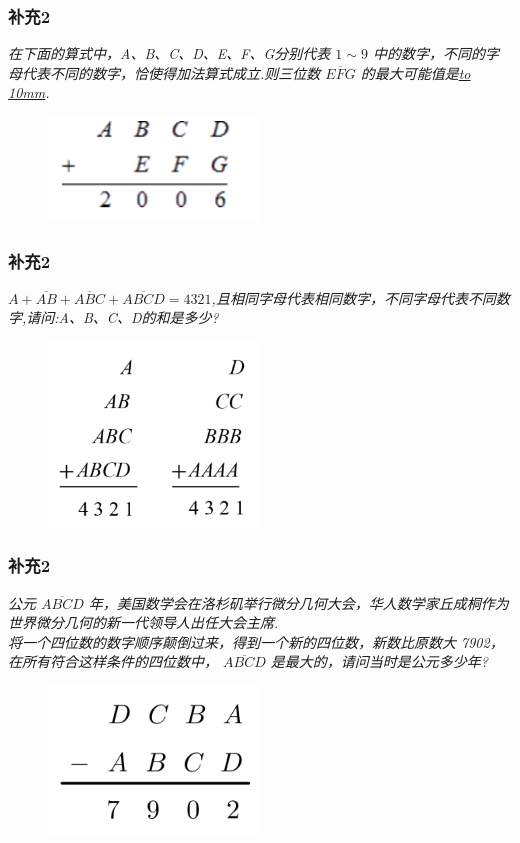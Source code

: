 \begin{frame}
    \frametitle{补充2}
    \textit{在下面的算式中，A、B、C、D、E、F、G分别代表 $1\sim 9$ 中的数字，不同的字母代表不同的数字，恰使得加法算式成立.则三位数 $\overline{EFG}$ 的最大可能值是\underline{\hbox to 10mm{}}.}
    \begin{figure}[H] 
        \centering
        \includegraphics[width=0.5\textwidth]{./pics/Chapter_3/buchong2_1.png}
    \end{figure}
\end{frame}

\begin{frame}
    \frametitle{补充2}
    \textit{$A+ \overline{AB} + \overline{ABC} + \overline{ABCD} = 4321$,且相同字母代表相同数字，不同字母代表不同数字,请问:A、B、C、D的和是多少?}
    \begin{figure}[H] 
        \centering
        \includegraphics[width=0.5\textwidth]{./pics/Chapter_3/buchong2_2.png}
    \end{figure}
\end{frame}

\begin{frame}
    \frametitle{补充2}
    \textit{公元 $\overline{ABCD}$ 年，美国数学会在洛杉矶举行微分几何大会，华人数学家丘成桐作为世界微分几何的新一代领导人出任大会主席.\\
    将一个四位数的数字顺序颠倒过来，得到一个新的四位数，新数比原数大 7902，在所有符合这样条件的四位数中， $\overline{ABCD}$ 是最大的，请问当时是公元多少年?}
    \begin{figure}[H] 
        \centering
        \includegraphics[width=0.5\textwidth]{./pics/Chapter_3/buchong2_3.png}
    \end{figure}
\end{frame}

